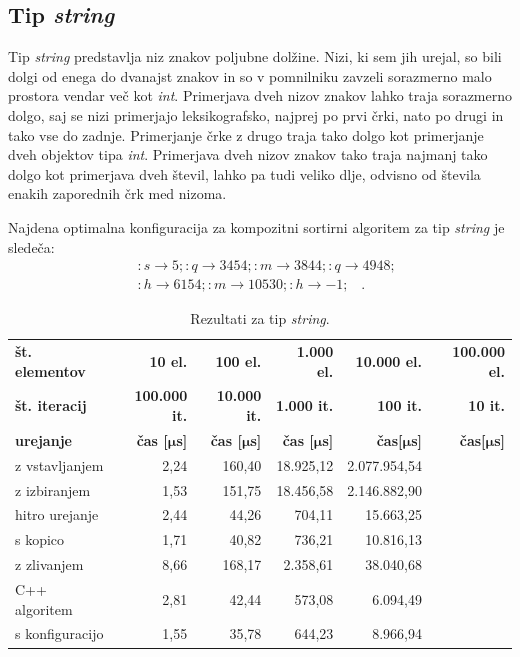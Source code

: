 \documentclass[a4paper,oneside,12pt]{article}
\newcommand{\lra}{\ensuremath{\longrightarrow}}
\newcommand{\edot}{\;\;\;.}
\newcommand{\bmu}{\ensuremath{\boldsymbol{\mu}}}
\newcommand{\usec}{\ensuremath{\bmu}s}
\begin{document}
\subsection{Tip \emph{string}}
Tip \emph{string} predstavlja niz znakov poljubne dolžine. Nizi, ki sem jih urejal, so
bili dolgi od enega do dvanajst znakov in so v pomnilniku zavzeli sorazmerno malo prostora
vendar več kot \emph{int}. Primerjava dveh nizov znakov lahko traja sorazmerno dolgo, saj se
nizi primerjajo leksikografsko, najprej po prvi črki, nato po drugi in tako vse do zadnje.
Primerjanje črke z drugo traja tako dolgo kot primerjanje dveh objektov tipa \emph{int}.
Primerjava dveh nizov znakov tako traja najmanj tako dolgo kot primerjava dveh števil, lahko
pa tudi veliko dlje, odvisno od števila enakih zaporednih črk med nizoma.

Najdena optimalna konfiguracija za kompozitni sortirni algoritem za tip \emph{string} je sledeča:
\begin{align*}
  \ & :s \lra 5;:q \lra 3454;:m \lra 3844;:q \lra 4948; \\
  \ & :h \lra 6154;:m \lra 10530;:h \lra -1; \edot 
\end{align*}

\begin{table}[h]
  \caption{Rezultati za tip \emph{string}.}
  \label{tab:rez:string} \vspace{1ex}
  \begin{tabular}{l!{\vrule width 1pt}r|r|r|r|r}
    \bf št. elementov     & \bf 10 el.& \bf 100 el.& \bf 1.000 el. & \bf 10.000 el. & \bf 100.000 el. \\ 
    \bf št. iteracij      & \bf 100.000 it. & \bf 10.000 it. & \bf 1.000 it. & \bf 100 it. &  \bf 10 it.\\ \hline
    \bf urejanje          & \bf čas [\usec] & \bf čas [\usec] & \bf čas [\usec] & \bf čas[\usec] & \bf čas[\usec] \\  
    z vstavljanjem        & 2,24 & 160,40 & 18.925,12 & 2.077.954,54 & \\ \hline
    z izbiranjem          & 1,53 & 151,75 & 18.456,58 & 2.146.882,90 & \\ \hline
    hitro urejanje        & 2,44 &  44,26 &    704,11 &   15.663,25 & \\ \hline
    s kopico              & 1,71 &  40,82 &    736,21 &   10.816,13 & \\ \hline
    z zlivanjem           & 8,66 & 168,17 &  2.358,61 &   38.040,68 & \\ \hline
    C++ algoritem         & 2,81 &  42,44 &    573,08 &    6.094,49 & \\ \hline
    s konfiguracijo         & 1,55 &  35,78 &    644,23 &    8.966,94 & \\ 
  \end{tabular}
\end{table}
\end{document}
